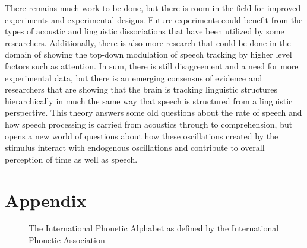 \documentclass[titlepage]{article}
\begin{document}
    There remains much work to be done, but there is room in the field 
    for improved experiments and experimental designs. Future experiments could benefit from the types of 
    acoustic and linguistic dissociations that have been utilized by some 
    researchers. Additionally, there is also more research that could be done in the 
    domain of showing the top-down modulation of speech tracking by higher level
    factors such as attention. In sum, there is still disagreement and a need for 
    more experimental data, but there is an emerging consensus of evidence and 
    researchers that are showing that the brain is tracking linguistic 
    structures hierarchically in much the same way that speech is structured 
    from a linguistic perspective. This theory answers some old questions about 
    the rate of speech and how speech processing is carried from acoustics 
    through to comprehension, but opens a new world of questions about how 
    these oscillations created by the stimulus interact with endogenous oscillations 
    and contribute to overall perception of time as well as speech.

\appendix
\section{Appendix}


\renewcommand\thefigure{\thesection.\arabic{figure}}    
\setcounter{figure}{0}

  \begin{figure}[h]
    \caption{The International Phonetic Alphabet as defined by the International
    Phonetic Association}
    \label{ipaChart}
  \end{figure}

\newpage
\printbibliography
\end{document}
